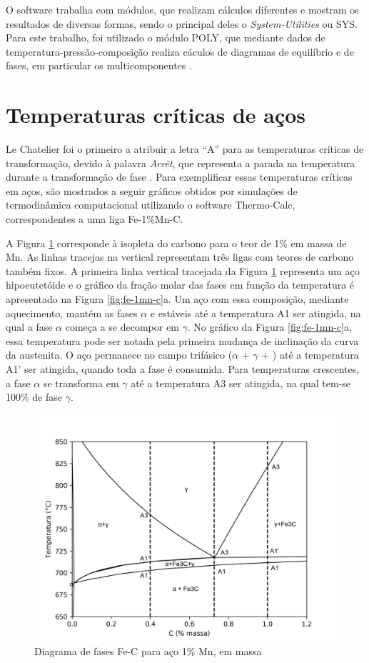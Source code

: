 \documentclass[brazil,tf,epusp]{usp}  %
\begin{document}
O software trabalha com módulos, que realizam cálculos diferentes e mostram os resultados de diversas formas, sendo o principal deles o \textit{System-Utilities} ou SYS. Para este trabalho, foi utilizado o módulo POLY, que mediante dados de temperatura-pressão-composição realiza cáculos de diagramas de equilíbrio e de fases, em particular os multicomponentes \cite{TC2002}.

\section{Temperaturas cr\'iticas de aços}

Le Chatelier foi o primeiro a atribuir a letra ``A'' para as temperaturas críticas de transformação, devido à palavra \textit{Arrêt}, que representa a parada na temperatura durante a transformação de fase \cite{Silva2010}. Para exemplificar essas temperaturas críticas em aços, são mostrados a seguir gráficos obtidos por simulações de termodinâmica computacional utilizando o software Thermo-Calc\textregistered{},  correspondentes a uma liga Fe-1\%Mn-C.

A Figura \ref{fig:fe-1mn-C_isopleth} corresponde à isopleta do carbono para o teor de 1\% em massa de Mn. As linhas tracejas na vertical representam três ligas com teores de carbono também fixos. A primeira linha vertical tracejada da Figura \ref{fig:fe-1mn-C_isopleth} representa um aço hipoeutetóide e o gráfico da fração molar das fases em função da temperatura é apresentado na Figura \ref{fig:fe-1mn-c}a. Um aço com essa composição, mediante aquecimento, mantém as fases $\alpha$ e  estáveis até a temperatura A1 ser atingida, na qual a fase $\alpha$ começa a se decompor em $\gamma$. No gráfico da Figura \ref{fig:fe-1mn-c}a, essa temperatura pode ser notada pela primeira mudança de inclinação da curva da austenita. O aço permanece no campo trifásico ($\alpha$ + $\gamma$ + ) até a temperatura A1' ser atingida, quando toda a fase  é consumida. Para temperaturas crescentes, a fase $\alpha$ se transforma em $\gamma$ até a temperatura A3 ser atingida, na qual tem-se 100\% de fase $\gamma$.

\begin{figure}[ht!]
  \includegraphics[width=.9\textwidth]{img/Fe-1Mn-C_isopleth_edited.png}
  \caption{Diagrama de fases Fe-C para aço 1\% Mn, em massa}
  \label{fig:fe-1mn-C_isopleth}
\end{figure}
\end{document}
